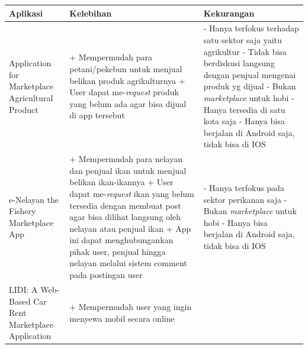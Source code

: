 \documentclass[a4paper]{article}
\begin{document}
\begin{itemize}
    \begin{centering}
    \begin{longtable}{|p{3cm}|p{5cm}|p{5cm}|}
        \hline
        Aplikasi & Kelebihan                                                                                                                 & Kekurangan \\
        \hline
        Application for Marketplace Agricultural Product
                & + Mempermudah para petani/pekebun untuk menjual belikan produk agrikulturnya \newline
        + User dapat me-\textit{request} produk yang belum ada agar bisa dijual di app tersebut \newline
                & - Hanya terfokus terhadap satu sektor saja yaitu agrikultur \newline
        - Tidak bisa berdiskusi langsung dengan penjual mengenai produk yg dijual \newline
        - Bukan \textit{marketplace} untuk hobi \newline
        - Hanya tersedia di satu kota saja \newline
        - Hanya bisa berjalan di Android saja, tidak bisa di IOS                                                                                     \\
        \hline
        e-Nelayan the Fishery Marketplace App
                & + Mempermudah para nelayan dan penjual ikan untuk menjual belikan ikan-ikannya \newline
        + User dapat me-\textit{request} ikan yang belum tersedia dengan membuat post agar bisa dilihat langsung oleh nelayan atau penjual ikan \newline
        + App ini dapat menghubungankan pihak user, penjual hingga nelayan melalui sistem comment pada postingan user \newline
                & - Hanya terfokus pada sektor perikanan saja \newline
        - Bukan \textit{marketplace} untuk hobi \newline
        - Hanya bisa berjalan di Android saja, tidak bisa di IOS                                                                                     \\
        \hline
        LIDI: A Web-Based Car Rent Marketplace Application
                & + Mempermudah user yang ingin menyewa mobil secara online \newline

\end{longtable}
\end{centering}
\end{itemize}
\end{document}
